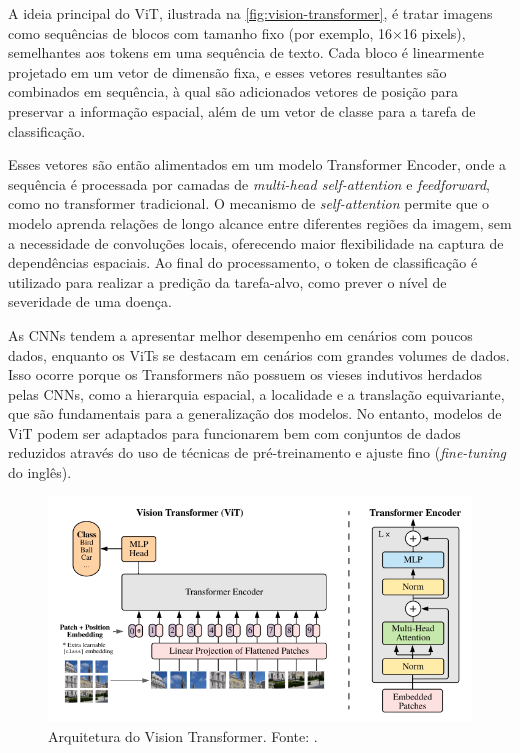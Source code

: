 A ideia principal do ViT, ilustrada na \autoref{fig:vision-transformer}, é tratar imagens como sequências de blocos com tamanho fixo (por exemplo, 16×16 pixels), semelhantes aos tokens em uma sequência de texto. Cada bloco é linearmente projetado em um vetor de dimensão fixa, e esses vetores resultantes são combinados em sequência, à qual são adicionados vetores de posição para preservar a informação espacial, além de um vetor de classe para a tarefa de classificação.

Esses vetores são então alimentados em um modelo Transformer Encoder, onde a sequência é processada por camadas de \textit{multi-head self-attention} e \textit{feedforward}, como no transformer tradicional. O mecanismo de \textit{self-attention} permite que o modelo aprenda relações de longo alcance entre diferentes regiões da imagem, sem a necessidade de convoluções locais, oferecendo maior flexibilidade na captura de dependências espaciais. Ao final do processamento, o token de classificação é utilizado para realizar a predição da tarefa-alvo, como prever o nível de severidade de uma doença.

As CNNs tendem a apresentar melhor desempenho em cenários com poucos dados, enquanto os ViTs se destacam em cenários com grandes volumes de dados. Isso ocorre porque os Transformers não possuem os vieses indutivos herdados pelas CNNs, como a hierarquia espacial, a localidade e a translação equivariante, que são fundamentais para a generalização dos modelos. No entanto, modelos de ViT podem ser adaptados para funcionarem bem com conjuntos de dados reduzidos através do uso de técnicas de pré-treinamento e ajuste fino (\textit{fine-tuning} do inglês).

\begin{figure}
    \centering
    \includegraphics[width=1.0\linewidth]{figs/vision-transformer.png}
    \caption{Arquitetura do Vision Transformer. Fonte: \cite{Dosovitskiy2021}.}
    \label{fig:vision-transformer}
\end{figure}

